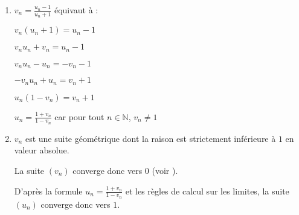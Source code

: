\begin{corrige}
\begin{enumerate}
\begin{enumerate}
               \item
               $v_{n}=\frac{u_{n}-1}{u_{n}+1}$ équivaut à :
               \par
               $v_{n}\left(u_{n}+1\right)=u_{n}-1$
               \par
               $v_{n}u_{n}+v_{n}=u_{n}-1$
               \par
               $v_{n}u_{n}-u_{n}=-v_{n}-1$
               \par
               $-v_{n}u_{n}+u_{n}=v_{n}+1$
               \par
               $u_{n}\left(1-v_{n}\right)=v_{n}+1$
               \par
               $u_{n}=\frac{1+v_{n}}{1-v_{n}}$ car pour tout $n \in  \mathbb{N}$, $v_{n}\neq 1$
               \item
               $v_{n}$ est une suite géométrique dont la raison est strictement inférieure à $1$ en valeur absolue.
               \par
               La suite $\left(v_{n}\right)$ converge donc vers $0$ (voir ).
               \par
               D'après la formule $u_{n}=\frac{1+v_{n}}{1-v_{n}}$ et les règles de calcul sur les limites, la suite $\left(u_{n}\right)$ converge donc vers $1$.
          \end{enumerate}
     \end{enumerate}
\end{corrige}
